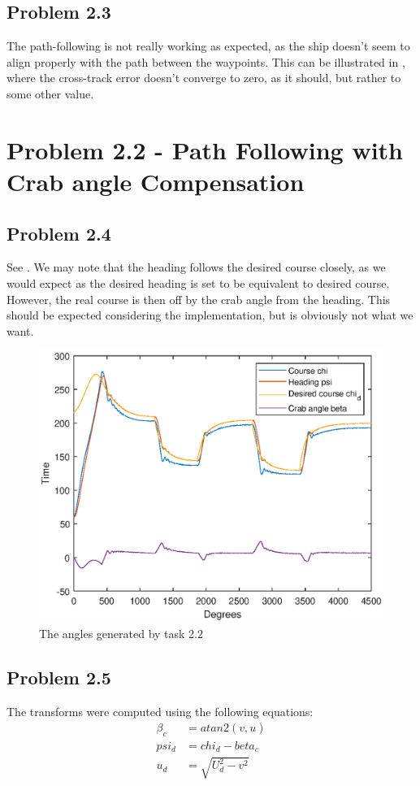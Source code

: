 \subsection*{Problem 2.3}
The path-following is not really working as expected, as the ship doesn't seem to align properly with the path between the waypoints. This can be illustrated in , where the cross-track error doesn't converge to zero, as it should, but rather to some other value. 

\section*{Problem 2.2 - Path Following with Crab angle Compensation}
\subsection*{Problem 2.4}
See . We may note that the heading follows the desired course closely, as we would expect as the desired heading is set to be equivalent to desired course. However, the real course is then off by the crab angle from the heading. This should be expected considering the implementation, but is obviously not what we want. 

\begin{figure}[ht]
	\centering
	\includegraphics[width=\textwidth]{angles2_4}
	\caption{The angles generated by task 2.2}
	\label{fig:angles2_4}
\end{figure}

\subsection*{Problem 2.5}
The transforms were computed using the following equations: 
\begin{align*}
	\beta_c &= atan2(v, u) \\
	psi_d &= chi_d - beta_c \\
	u_d &= \sqrt{U_d^2 - v^2}
\end{align*}


